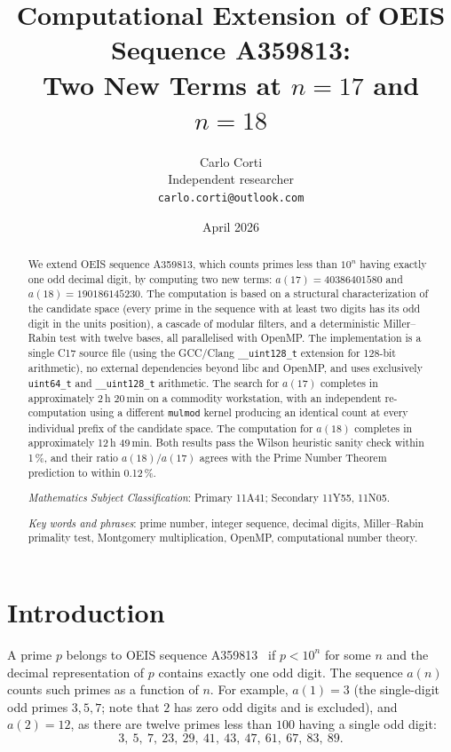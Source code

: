 \documentclass[11pt,a4paper]{article}
\title{Computational Extension of OEIS Sequence A359813:\\
Two New Terms at $n=17$ and $n=18$}
\author{%
  Carlo Corti\\
  \small Independent researcher\\
  \small \texttt{carlo.corti@outlook.com}%
}
\date{April 2026}
\theoremstyle{definition}
\begin{document}
\maketitle

\begin{abstract}
We extend OEIS sequence A359813, which counts primes less than $10^n$ having
exactly one odd decimal digit, by computing two new terms:
$a(17) = \num{40386401580}$ and $a(18) = \num{190186145230}$.
The computation is based on a structural characterization of the candidate
space (every prime in the sequence with at least two digits has its odd digit
in the units position), a cascade of modular filters, and a deterministic
Miller--Rabin test with twelve bases, all parallelised with OpenMP. The
implementation is a single C17 source file (using the GCC/Clang
\texttt{\_\_uint128\_t} extension for 128-bit arithmetic), no external
dependencies beyond libc and OpenMP, and uses exclusively \texttt{uint64\_t}
and \texttt{\_\_uint128\_t} arithmetic. The search for $a(17)$ completes in
approximately 2\,h 20\,min on a commodity workstation, with an independent
re-computation using a different \texttt{mulmod} kernel producing an
identical count at every individual prefix of the candidate space. The computation for $a(18)$ completes in
approximately 12\,h 49\,min. Both results pass the Wilson heuristic sanity
check within 1\,\%, and their ratio $a(18)/a(17)$ agrees with the Prime
Number Theorem prediction to within 0.12\,\%.

\medskip
{} \emph{Mathematics Subject Classification}: Primary 11A41; Secondary
11Y55, 11N05.

\noindent
\emph{Key words and phrases}: prime number, integer sequence, decimal digits,
Miller--Rabin primality test, Montgomery multiplication, OpenMP,
computational number theory.
\end{abstract}

\section{Introduction}

A prime $p$ belongs to OEIS sequence A359813~\cite{OEIS-A359813} if
$p < 10^n$ for some $n$ and the decimal representation of $p$ contains
exactly one odd digit. The sequence $a(n)$ counts such primes as a function
of $n$. For example, $a(1) = 3$ (the single-digit odd primes $3, 5, 7$;
note that $2$ has zero odd digits and is excluded), and $a(2) = 12$, as
there are twelve primes less than $100$ having a single odd digit:
\[
  3,\ 5,\ 7,\ 23,\ 29,\ 41,\ 43,\ 47,\ 61,\ 67,\ 83,\ 89.
\]
\end{document}
